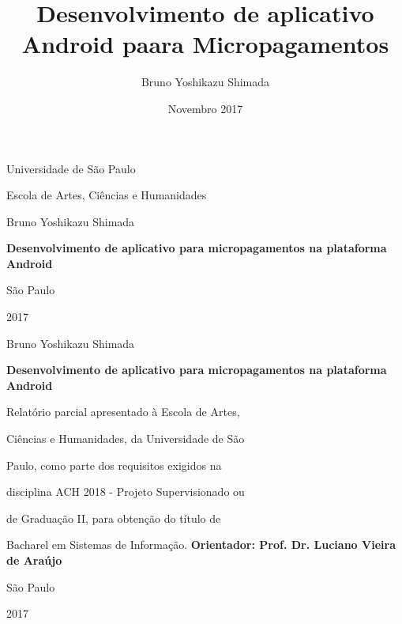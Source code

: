 \documentclass[hidelinks,12pt]{article}
\author{Bruno Yoshikazu Shimada}
\title{\textbf{Desenvolvimento de aplicativo Android paara Micropagamentos}
	}
\date{Novembro 2017}
\begin{document}
\begin{titlepage}
	\centering
	{\Large Universidade de S\~ao Paulo\par}
	{\Large Escola de Artes, Ci\^encias e Humanidades\par}
	\vfill
	{\Large Bruno Yoshikazu Shimada\par}
	\vspace{1cm}
	{\Large\bfseries Desenvolvimento de aplicativo para micropagamentos na plataforma Android\par}
	\vfill
	{\Large S\~ao Paulo\par}
	{\Large 2017\par}
\end{titlepage}
\newpage
\begin{titlepage}
	\centering
	{\Large Bruno Yoshikazu Shimada\par}
	\vspace{2cm}
	{\Large\bfseries Desenvolvimento de aplicativo para micropagamentos na plataforma Android\par}
	\vfill
	\begin{flushright}
		\hspace{5cm}Relat\'orio parcial apresentado \`a Escola de Artes,
	
		\hspace{7cm}Ci\^encias e Humanidades, da Universidade de S\~ao
	
		\hspace{7cm}Paulo, como parte dos requisitos exigidos na
	
		\hspace{7cm}disciplina ACH 2018 - Projeto Supervisionado ou
	
		\hspace{7cm}de Gradua\c{c}\~ao II, para obten\c{c}\~ao do t\'itulo de
	
		\hspace{7cm}Bacharel em Sistemas de Informa\c{c}\~ao.
		\bfseries Orientador: Prof. Dr. Luciano Vieira de Ara\'ujo
	\end{flushright}
	\vspace{2cm}
	{\Large S\~ao Paulo\par}
	{\Large 2017\par}
\end{titlepage}
\newpage
\end{document}
